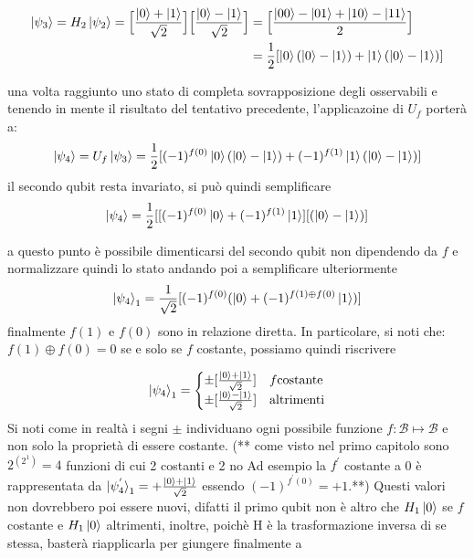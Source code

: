 \documentclass[12pt,a4paper,openright]{report}
\newcommand*\xor{\mathbin{\oplus}}
\begin{document}
\begin{center}
    \begin{align*}
        \ket{\psi_3} = H_2\ket{\psi_2} = \Big[  \frac{\ket{0} + \ket{1}}{\sqrt2} \Big]\Big[  \frac{\ket{0} - \ket{1}}{\sqrt2} \Big] &= \Big[  \frac{\ket{00} - \ket{01} + \ket{10} - \ket{11}}{2} \Big] \\
                                                                                                                                    &= \frac{1}{2}[\ket{0} (\ket{0} - \ket{1}) + \ket{1}(\ket{0} - \ket{1})] 
    \end{align*}
\end{center}
una volta raggiunto uno stato di completa sovrapposizione degli osservabili e tenendo in mente il risultato del tentativo precedente, l'applicazoine di $U_f$ porterà a:
\[
    \ket{\psi_4} = U_f\ket{\psi_3} = \frac{1}{2}[(-1)^{f(0)}\ket{0} (\ket{0} - \ket{1}) + (-1)^{f(1)}\ket{1}(\ket{0} - \ket{1})] 
\]
il secondo qubit resta invariato, si può quindi semplificare
\[
    \ket{\psi_4} = \frac{1}{2}[ [ (-1)^{f(0)}\ket{0} + (-1)^{f(1)}\ket{1} ] [ (\ket{0} - \ket{1}) ]
\]

\noindent a questo punto è possibile dimenticarsi del secondo qubit non dipendendo da $f$ e normalizzare quindi lo stato andando poi a semplificare ulteriormente
\[
   \ket{\psi_4}_1 = \frac{1}{\sqrt2}[(-1)^{f(0)}(\ket0 + (-1)^{f(1) \xor f(0)}\ket{1} )]
\]
finalmente $f(1)$ e $ f(0)$ sono in relazione diretta. In particolare, si noti che: $f(1) \xor f(0)= 0$ se e solo se $f$ costante, possiamo quindi riscrivere

\[
    \ket{\psi_4}_1 =
    \begin{cases} 
        \pm [\frac{\ket0 + \ket1}{\sqrt2}] & f \text{costante}\\
        \pm [\frac{\ket0 - \ket1}{\sqrt2}] & \text{altrimenti}
    \end{cases}
 \]
 Si noti come in realtà i segni $\pm$ individuano ogni possibile funzione $f:\mathcal{B}\mapsto \mathcal{B}$ e non solo la proprietà di essere costante. (** come visto nel primo capitolo sono $2^{(2^1)}=4$ funzioni di cui 2 costanti e 2 no Ad esempio la  $f^{'}$ costante a 0 è rappresentata da $ \ket{\psi_4^{'}}_1 = + \frac{\ket0 + \ket1}{\sqrt2}$ essendo $(-1)^{f^{'}(0)} = +1$.**)
 Questi valori non dovrebbero poi essere nuovi, difatti il primo qubit non è altro che $H_1\ket0$ se $f$ costante e $H_1\ket0$ altrimenti, inoltre, poichè H è la trasformazione inversa di se stessa, basterà riapplicarla
 per giungere finalmente a
 
\end{document}

